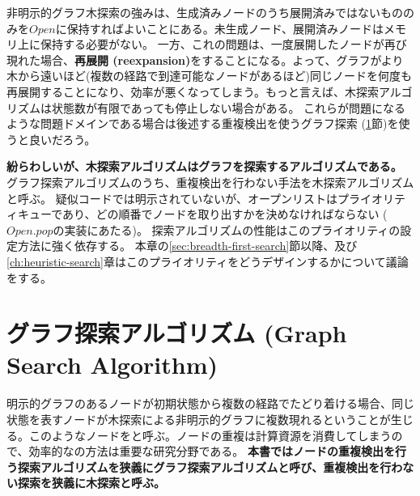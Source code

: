 非明示的グラフ木探索の強みは、生成済みノードのうち展開済みではないもののみを$Open$に保持すればよいことにある。未生成ノード、展開済みノードはメモリ上に保持する必要がない。
一方、これの問題は、一度展開したノードが再び現れた場合、{\bf 再展開 (reexpansion)}をすることになる。よって、グラフがより木から遠いほど(複数の経路で到達可能なノードがあるほど)同じノードを何度も再展開することになり、効率が悪くなってしまう。もっと言えば、木探索アルゴリズムは状態数が有限であっても停止しない場合がある。
これらが問題になるような問題ドメインである場合は後述する重複検出を使うグラフ探索 (\ref{sec:graph-search-algorithm}節)を使うと良いだろう。

{\bf 紛らわしいが、木探索アルゴリズムはグラフを探索するアルゴリズムである。}
グラフ探索アルゴリズムのうち、重複検出を行わない手法を木探索アルゴリズムと呼ぶ。
疑似コードでは明示されていないが、オープンリストはプライオリティキューであり、どの順番でノードを取り出すかを決めなければならない ($Open.pop$の実装にあたる)。
探索アルゴリズムの性能はこのプライオリティの設定方法に強く依存する。
本章の\ref{sec:breadth-first-search}節以降、及び\ref{ch:heuristic-search}章はこのプライオリティをどうデザインするかについて議論をする。





\section{グラフ探索アルゴリズム (Graph Search Algorithm)}
\label{sec:graph-search-algorithm}


明示的グラフのあるノードが初期状態から複数の経路でたどり着ける場合、同じ状態を表すノードが木探索による非明示的グラフに複数現れるということが生じる。このようなノードをと呼ぶ。ノードの重複は計算資源を消費してしまうので、効率的なの方法は重要な研究分野である。
{\bf 本書ではノードの重複検出を行う探索アルゴリズムを狭義にグラフ探索アルゴリズムと呼び、重複検出を行わない探索を狭義に木探索と呼ぶ。}


